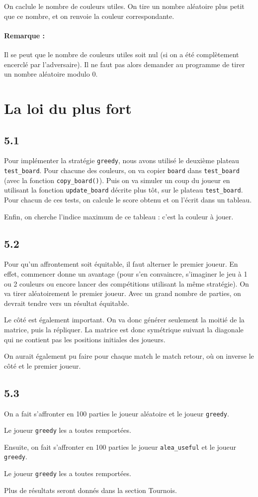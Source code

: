 \documentclass[12pt]{article}
\def\question#1{\subsection{#1}}
\def\sec#1{\section{#1}}
\begin{document}
On caclule le nombre de couleurs utiles. On tire un nombre aléatoire plus petit que ce nombre, et on renvoie la couleur correspondante.

\paragraph{Remarque :} Il se peut que le nombre de couleurs utiles soit nul (si on a été complètement encerclé par l'adversaire). Il ne faut pas alors demander au programme de tirer un nombre aléatoire modulo 0.

\sec{La loi du plus fort}
\question{5.1}
Pour implémenter la stratégie \texttt{greedy}, nous avons utilisé le deuxième plateau \texttt{test\_board}.
Pour chacune des couleurs, on va copier \texttt{board} dans \texttt{test\_board} (avec la fonction \texttt{copy\_board()}). Puis on va simuler un coup du joueur en utilisant la fonction \texttt{update\_board} décrite plus tôt, sur le plateau \texttt{test\_board}. Pour chacun de ces tests, on calcule le score obtenu et on l'écrit dans un tableau.

Enfin, on cherche l'indice maximum de ce tableau : c'est la couleur à jouer.


\question{5.2}
Pour qu'un affrontement soit équitable, il faut alterner le premier joueur. En effet, commencer donne un avantage (pour s'en convaincre, s'imaginer le jeu à 1 ou 2 couleurs ou encore lancer des compétitions utilisant la même stratégie). On va tirer aléatoirement le premier joueur. Avec un grand nombre de parties, on devrait tendre vers un résultat équitable.

Le côté est également important. On va donc générer seulement la moitié de la matrice, puis la répliquer. La matrice est donc symétrique suivant la diagonale qui ne contient pas les positions initiales des joueurs. 

On aurait également pu faire pour chaque match le match retour, où on inverse le côté et le premier joueur.

\question{5.3}
On a fait s'affronter en 100 parties le joueur aléatoire et le joueur \texttt{greedy}.

Le joueur \texttt{greedy} les a toutes remportées.

Ensuite, on fait s'affronter en 100 parties le joueur \texttt{alea\_useful} et le joueur \texttt{greedy}.

Le joueur \texttt{greedy} les a toutes remportées.

Plus de résultats seront donnés dans la section Tournois.
\end{document}
